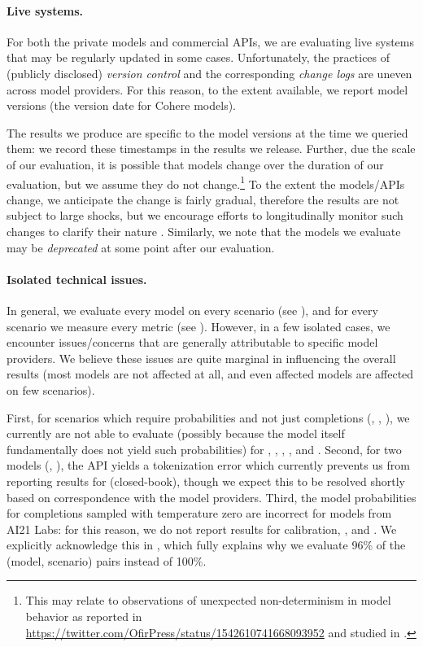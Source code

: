\paragraph{Live systems.}
For both the private models and commercial APIs, we are evaluating live systems that may be regularly updated in some cases.
Unfortunately, the practices of (publicly disclosed) \textit{version control} and the corresponding \textit{change logs} are uneven across model providers.
For this reason, to the extent available, we report model versions (\eg the version date for Cohere models).

The results we produce are specific to the model versions at the time we queried them: we record these timestamps in the results we release.
Further, due the scale of our evaluation, it is possible that models change over the duration of our evaluation, but we assume they do not change.\footnote{This may relate to observations of unexpected non-determinism in model behavior as reported in \url{https://twitter.com/OfirPress/status/1542610741668093952} and studied in \citet{ruis2022large}.}
To the extent the models/APIs change, we anticipate the change is fairly gradual, therefore the results are not subject to large shocks, but we encourage efforts to longitudinally monitor such changes to clarify their nature  \citep[\cf][]{chen2022hapi}.
Similarly, we note that the models we evaluate may be \textit{deprecated} at some point after our evaluation.

\paragraph{Isolated technical issues.}
In general, we evaluate every model on every scenario (see ), and for every scenario we measure every metric (see ). 
However, in a few isolated cases, we encounter issues/concerns that are generally attributable to specific model providers.
We believe these issues are quite marginal in influencing the overall results (\eg most models are not affected at all, and even affected models are affected on few scenarios).

First, for scenarios which require probabilities and not just completions (\eg \hellaswag, \msmarcoregular, \pile), we currently are not able to evaluate (possibly because the model itself fundamentally does not yield such probabilities) for \tzero, \tfive, \ultwo, \glm, and \yalm.
Second, for two models (\jurassicjumbo, \jurassicgrande), the API yields a tokenization error which currently prevents us from reporting results for \naturalquestions (closed-book), though we expect this to be resolved shortly based on correspondence with the model providers.
Third, the model probabilities for completions sampled with temperature zero are incorrect for models from AI21 Labs: for this reason, we do not report results for calibration, \msmarcoregular, and \msmarcotrec.
We explicitly acknowledge this in , which fully explains why we evaluate 96\% of the (model, scenario) pairs instead of 100\%. 

